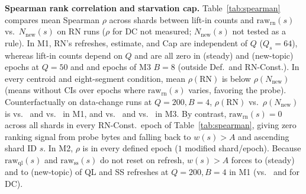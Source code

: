 \textbf{Spearman rank correlation and starvation cap.} Table~\ref{tab:spearman} compares mean Spearman $\rho$ across \RNumNumShards{} shards between lift-in counts and $\text{raw}_{\text{rn}}(s)$ vs.\ $N_{\text{new}}(s)$ on RN runs ($\rho$ for DC not measured; $N_{\text{new}}(s)$ not tested as a rule). In M1, RN's refreshes, estimate, and Cap are independent of $Q$ ($Q_s{=}64$), whereas lift-in counts depend on $Q$ and are all zero in \RNumSpearmanZeroTrueSteadyMOneQFifty{} (steady) and \RNumSpearmanZeroTrueNewTopicMOneQFifty{} (new-topic) epochs at $Q{=}50$ and \RNumSpearmanZeroTrueSteadyMThreeBEight{} and \RNumSpearmanZeroTrueNewTopicMThreeBEight{} epochs of M3 $B{=}8$ (outside Def.\ and RN-Const.). In every centroid and eight-segment condition, mean $\rho(\text{RN})$ is below $\rho(N_{\text{new}})$ (means without CIs over epochs where $\text{raw}_{\text{rn}}(s)$ varies, favoring the probe). Counterfactually on data-change runs at $Q{=}200, B{=}4$, $\rho(\text{RN})$ vs.\ $\rho(N_{\text{new}})$ is \RNumSpearmanRNOnDCSteadyMOne{} vs.\ \RNumSpearmanNewVecsOnDCSteadyMOne{} and \RNumSpearmanRNOnDCNewTopicMOne{} vs.\ \RNumSpearmanNewVecsOnDCNewTopicMOne{} in M1, and \RNumSpearmanRNOnDCSteadyMThree{} vs.\ \RNumSpearmanNewVecsOnDCSteadyMThree{} and \RNumSpearmanRNOnDCNewTopicMThree{} vs.\ \RNumSpearmanNewVecsOnDCNewTopicMThree{} in M3. By contrast, $\text{raw}_{\text{rn}}(s) = 0$ across all \RNumNumShards{} shards in every RN-Const.\ epoch of Table~\ref{tab:spearman}, giving zero ranking signal from \RNumRNOverheadEpochBytes{} probe bytes and falling back to $w(s) > A$ and ascending shard ID $s$. In M2, $\rho$ is \RNumSpearmanDegenerateMTwo{} in every defined epoch ($1$ modified shard/epoch). Because $\text{raw}_{\text{ql}}(s)$ and $\text{raw}_{\text{ss}}(s)$ do not reset on refresh, $w(s) > A$ forces \RNumForcedShareQLSteadyMOne{} to \RNumForcedShareSSSteadyMOne{} (steady) and \RNumForcedShareSSNewTopicMOne{} to \RNumForcedShareQLNewTopicMOne{} (new-topic) of QL and SS refreshes at $Q{=}200, B{=}4$ in M1 (vs.\ \RNumForcedShareDCSteadyMOne{} and \RNumForcedShareDCNewTopicMOne{} for DC).

